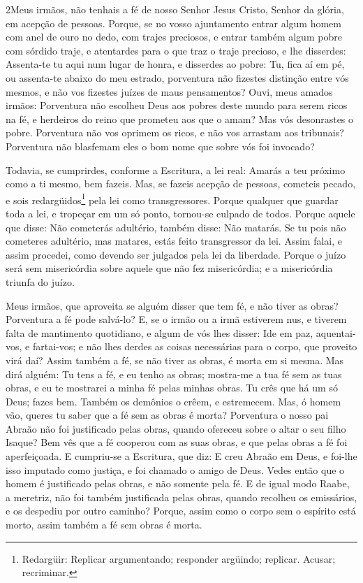\medskip

\lettrine{2} Meus irmãos, não tenhais a fé de nosso Senhor
Jesus Cristo, Senhor da glória, em acepção de pessoas. Porque,
se no vosso ajuntamento entrar algum homem com anel de ouro no dedo,
com trajes preciosos, e entrar também algum pobre com sórdido traje,
e atentardes para o que traz o traje precioso, e lhe disserdes:
Assenta-te tu aqui num lugar de honra, e disserdes ao pobre: Tu,
fica aí em pé, ou assenta-te abaixo do meu estrado, porventura
não fizestes distinção entre vós mesmos, e não vos fizestes juízes
de maus pensamentos? Ouvi, meus amados irmãos: Porventura não
escolheu Deus aos pobres deste mundo para serem ricos na fé, e
herdeiros do reino que prometeu aos que o amam? Mas vós
desonrastes o pobre. Porventura não vos oprimem os ricos, e não vos
arrastam aos tribunais? Porventura não blasfemam eles o bom nome
que sobre vós foi invocado?

Todavia, se cumprirdes, conforme a Escritura, a lei real: Amarás a
teu próximo como a ti mesmo, bem fazeis. Mas, se fazeis acepção
de pessoas, cometeis pecado, e sois redargüidos\footnote{Redargüir:
Replicar argumentando; responder argüindo; replicar. Acusar;
recriminar.} pela lei como transgressores. Porque qualquer
que guardar toda a lei, e tropeçar em um só ponto, tornou-se culpado
de todos. Porque aquele que disse: Não cometerás adultério,
também disse: Não matarás. Se tu pois não cometeres adultério, mas
matares, estás feito transgressor da lei. Assim falai, e
assim procedei, como devendo ser julgados pela lei da liberdade.
Porque o juízo será sem misericórdia sobre aquele que não fez
misericórdia; e a misericórdia triunfa do juízo.

Meus irmãos, que aproveita se alguém disser que tem fé, e não
tiver as obras? Porventura a fé pode salvá-lo? E, se o irmão
ou a irmã estiverem nus, e tiverem falta de mantimento quotidiano,
e algum de vós lhes disser: Ide em paz, aquentai-vos, e
fartai-vos; e não lhes derdes as coisas necessárias para o corpo,
que proveito virá daí? Assim também a fé, se não tiver as
obras, é morta em si mesma. Mas dirá alguém: Tu tens a fé, e
eu tenho as obras; mostra-me a tua fé sem as tuas obras, e eu te
mostrarei a minha fé pelas minhas obras. Tu crês que há um só
Deus; fazes bem. Também os demônios o crêem, e estremecem.
Mas, ó homem vão, queres tu saber que a fé sem as obras é
morta? Porventura o nosso pai Abraão não foi justificado
pelas obras, quando ofereceu sobre o altar o seu filho Isaque?
Bem vês que a fé cooperou com as suas obras, e que pelas
obras a fé foi aperfeiçoada. E cumpriu-se a Escritura, que
diz: E creu Abraão em Deus, e foi-lhe isso imputado como justiça, e
foi chamado o amigo de Deus. Vedes então que o homem é
justificado pelas obras, e não somente pela fé. E de igual
modo Raabe, a meretriz, não foi também justificada pelas obras,
quando recolheu os emissários, e os despediu por outro caminho?
Porque, assim como o corpo sem o espírito está morto, assim
também a fé sem obras é morta.

